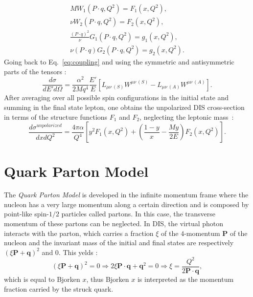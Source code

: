 %
\begin{equation}
  \begin{split}
    MW_1(P\cdot q,Q^2)=F_1(x,Q^2), \\
    \nu W_2(P\cdot q,Q^2)=F_2(x,Q^2), \\
    \frac{(P\cdot q)^2}{\nu}G_1(P\cdot q,Q^2)=g_1(x,Q^2), \\
    \nu(P\cdot q)G_2(P\cdot q,Q^2)=g_2(x,Q^2).
  \end{split}
  \label{eq:dimless}
\end{equation}
%
Going back to Eq.~\ref{eq:coupling} and using the symmetric and antisymmetric parts of the tensors :
%
\begin{equation}
  \frac{d\sigma}{dE'd\Omega} = \frac{\alpha^2}{2Mq^4}\frac{E'}{E}\left[L_{\mu\nu\ (S)}W^{\mu\nu\ (S)}-L_{\mu\nu\ (A)}W^{\mu\nu\ (A)}\right].
\end{equation}
%
After averaging over all possible spin configurations in the initial state and summing in the final state lepton, one obtains the unpolarized DIS cross-section in terms of the structure functions $F_1$ and $F_2$, neglecting the leptonic mass~:
%
\begin{equation}
  \frac{d\sigma^{unpolarized}}{dxdQ^2} = \frac{4\pi\alpha}{Q^4}\left[y^2F_1(x,Q^2)+\left(\frac{1-y}{x}-\frac{My}{2E}\right)F_2(x,Q^2)\right].
  \label{eq:unpolDIS}
\end{equation}


\section{Quark Parton Model}

The \textit{Quark Parton Model} \cite{Bjorken,Feynman} is developed in the infinite momentum frame where the nucleon has a very large momentum along a certain direction and is composed by point-like spin-$1/2$ particles called partons. In this case, the transverse momentum of these partons can be neglected. In DIS, the virtual photon interacts with the parton, which carries a fraction $\xi$ of the $4$-momentum \textbf{P} of the nucleon and the invariant mass of the initial and final states are respectively $(\xi\textbf{P}+\textbf{q})^2$ and $0$. This yelds :
%
\begin{equation}
  (\xi\textbf{P}+\textbf{q})^2 = 0 \Rightarrow 2\xi\textbf{P}\cdot\textbf{q}+\textbf{q}^2 = 0 \Rightarrow \xi = \frac{Q^2}{2\textbf{P}\cdot\textbf{q}},
\end{equation}
%
which is equal to Bjorken $x$, thus Bjorken $x$ is interpreted as the momentum fraction carried by the struck quark.

